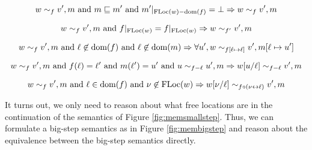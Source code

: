\documentclass{article}
\begin{document}
\begin{lem}
  \[w\sim_f v',m\text{ and }m\sqsubseteq m'\text{ and }m'|_{\text{FLoc}(w)-\text{dom}(f)}=\bot\Rightarrow w\sim_f v',m\]
\end{lem}

\begin{lem}
  \[w\sim_f v',m\text{ and }f|_{\text{FLoc}(w)}=f|_{\text{FLoc}(w)}\Rightarrow w\sim_{f'}v',m\]
\end{lem}

\begin{lem}
  \[w\sim_f v',m\text{ and }\ell\not\in\text{dom}(f)\text{ and }\ell\not\in\text{dom}(m)\Rightarrow\forall u',w\sim_{f[\ell\mapsto\ell]}v',m[\ell\mapsto u']\]
\end{lem}

\begin{lem}
  \[w\sim_f v',m\text{ and }f(\ell)=\ell'\text{ and }m(\ell')=u'\text{ and }u\sim_{f-\ell}u',m\Rightarrow w[u/\ell]\sim_{f-\ell}v',m\]
\end{lem}

\begin{lem}
  \[w\sim_f v',m\text{ and }\ell\in\text{dom}(f)\text{ and }\nu\not\in\text{FLoc}(w)\Rightarrow w[\nu/\ell]\sim_{f\circ(\nu\leftrightarrow\ell)}v',m\]
\end{lem}

It turns out, we only need to reason about what free locations are in the continuation of the semantics of Figure \ref{fig:memsmallstep}.
Thus, we can formulate a big-step semantics as in Figure \ref{fig:membigstep} and reason about the equivalence between the big-step semantics directly.
\end{document}
